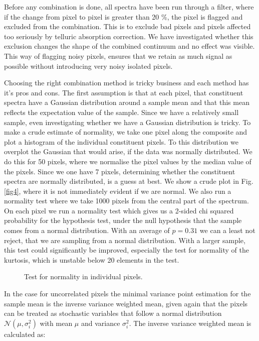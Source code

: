 \documentclass[iop]{emulateapj}
\begin{document}
Before any combination is done, all spectra have been run through a filter, where if the change from pixel to pixel is greater than 20 \%, the pixel is flagged and excluded from the combination. This is to exclude bad pixels and pixels affected too seriously by telluric absorption correction. We have investigated whether this exclusion changes the shape of the combined continuum and no effect was visible. This way of flagging noisy pixels, ensures that we retain as much signal as possible without introducing very noisy isolated pixels. 

Choosing the right combination method is tricky business and each method has it's pros and cons. The first assumption is that at each pixel, that constituent spectra have a Gaussian distribution around a sample mean and that this mean reflects the expectation value of the sample. Since we have a relatively small sample, even investigating whether we have a Gaussian distribution is tricky. To make a crude estimate of normality, we take one pixel along the composite and plot a histogram of the individual constituent pixels. To this distribution we overplot the Gaussian that would arise, if the data was normally distributed. We do this for 50 pixels, where we normalise the pixel values by the median value of the pixels. Since we one have 7 pixels, determining whether the constituent spectra are normally distributed, is a guess at best. We show a crude plot in Fig. \ref{fig4}, where it is not immediately evident if we are normal. We also run a normality test where we take 1000 pixels from the central part of the spectrum. On each pixel we run a normality test which gives us a 2-sided chi squared probability for the hypothesis test, under the null hypothesis that the sample comes from a normal distribution. With an average of $p = 0.31$ we can a least not reject, that we are sampling from a normal distribution. With a larger sample, this test could significantly be improved, especially the test for normality of the kurtosis, which is unstable below 20 elements in the test. 

 \begin{figure}
 \caption{Test for normality in individual pixels.\label{normality}}
 \end{figure}

In the case for uncorrelated pixels the minimal variance point estimation for the sample mean is the inverse variance weighted mean, given again that the pixels can be treated as stochastic variables that follow a normal distribution $\mathcal{N}(\mu, \sigma_i^2)$ with mean $\mu$ and variance $\sigma_i^2$. The inverse variance weighted mean is calculated as:
\end{document}
